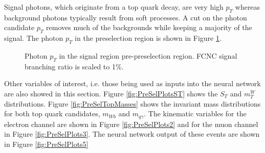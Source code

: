 Signal photons, which originate from a top quark decay, are very high $p_T$ whereas background photons typically result from soft processes.  A cut on the photon candidate $p_T$ removes much of the backgrounds while keeping a majority of the signal.  The photon $p_T$ in the preselection region is shown in Figure \ref{fig:PreSelPlots1}.  
\begin{figure}[h!]
\centering
{}\hfil
{}
\caption{Photon $p_T$ in the signal region pre-preselection region.  FCNC signal branching ratio is scaled to 1\%.}
\label{fig:PreSelPlots1}
\end{figure}

Other variables of interest, i.e. those being used as inputs into the neural network are also showed in this section.  Figure \ref{fig:PreSelPlotsST} shows the $S_T$ and $m_T^W$ distributions.  Figure \ref{fig:PreSelTopMasses} shows the invariant mass distributions for both top quark candidates, $m_{Wb}$ and $m_{q\gamma}$.  The kinematic variables for the electron channel are shown in Figure \ref{fig:PreSelPlots2} and for the muon channel in Figure \ref{fig:PreSelPlots3}.  The neural network output of these events are shown in Figure \ref{fig:PreSelPlots5}

